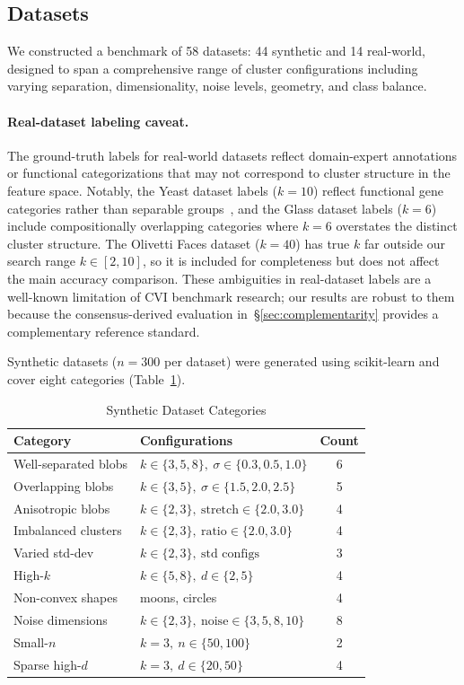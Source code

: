 \documentclass[journal]{IEEEtran}
\begin{document}
\subsection{Datasets}
\label{sec:datasets}

We constructed a benchmark of 58 datasets: 44 synthetic and 14 real-world, designed to span a comprehensive range of cluster configurations including varying separation, dimensionality, noise levels, geometry, and class balance.

\paragraph{Real-dataset labeling caveat.}
The ground-truth labels for real-world datasets reflect domain-expert annotations or functional categorizations that may not correspond to cluster structure in the feature space. Notably, the Yeast dataset labels ($k=10$) reflect functional gene categories rather than separable groups~\cite{arbelaitz2013extensive}, and the Glass dataset labels ($k=6$) include compositionally overlapping categories where $k=6$ overstates the distinct cluster structure. The Olivetti Faces dataset ($k=40$) has true $k$ far outside our search range $k \in [2, 10]$, so it is included for completeness but does not affect the main accuracy comparison. These ambiguities in real-dataset labels are a well-known limitation of CVI benchmark research; our results are robust to them because the consensus-derived evaluation in~\S\ref{sec:complementarity} provides a complementary reference standard.

Synthetic datasets ($n = 300$ per dataset) were generated using scikit-learn and cover eight categories (Table~\ref{tab:synthetic}).

\begin{table}[t]
\centering
\caption{Synthetic Dataset Categories}
\label{tab:synthetic}
\begin{tabular}{llc}
\toprule
Category & Configurations & Count\\
\midrule
Well-separated blobs & $k \in \{3,5,8\},\ \sigma \in \{0.3, 0.5, 1.0\}$ & 6\\
Overlapping blobs & $k \in \{3,5\},\ \sigma \in \{1.5, 2.0, 2.5\}$ & 5\\
Anisotropic blobs & $k \in \{2,3\},\ \text{stretch} \in \{2.0, 3.0\}$ & 4\\
Imbalanced clusters & $k \in \{2,3\},\ \text{ratio} \in \{2.0, 3.0\}$ & 4\\
Varied std-dev & $k \in \{2,3\},\ \text{std configs}$ & 3\\
High-$k$ & $k \in \{5,8\},\ d \in \{2,5\}$ & 4\\
Non-convex shapes & moons, circles & 4\\
Noise dimensions & $k \in \{2,3\},\ \text{noise} \in \{3,5,8,10\}$ & 8\\
Small-$n$ & $k=3,\ n \in \{50, 100\}$ & 2\\
Sparse high-$d$ & $k=3,\ d \in \{20, 50\}$ & 4\\
\bottomrule
\end{tabular}
\end{table}
\end{document}

